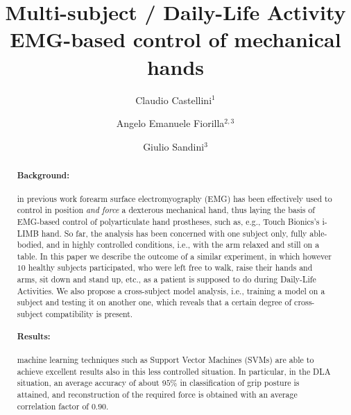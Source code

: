 \documentclass[10pt]{bmc_article}
\newenvironment{bmcformat}{\begin{raggedright}\baselineskip20pt\sloppy\setboolean{publ}{false}}{\end{raggedright}\baselineskip20pt\sloppy}
\begin{document}
\begin{bmcformat}

\title{Multi-subject / Daily-Life Activity\\EMG-based control of mechanical hands}
 
\author{%
  Claudio Castellini\correspondingauthor$^1$%
\and
  Angelo Emanuele Fiorilla$^{2,3}$%
\and
  Giulio Sandini$^3$%
}%

\address{%
    \iid(1)LIRA-Lab, University of Genova, viale F. Causa 13, 16145 Genova, Italy\\
    \iid(2)DIST, University of Genova, viale F. Causa 13, 16145 Genova, Italy\\
    \iid(3)Italian Institute of Technology, via Morego 30, 16163 Genova, Italy
}%

\maketitle

\begin{abstract}

\paragraph*{Background:}
in previous work \cite{2008.ICRA,2008.BioCyb}
forearm surface electromyography (EMG) has been effectively used to
control in position \emph{and force} a dexterous mechanical hand, thus laying the basis of
EMG-based control of polyarticulate hand prostheses, such as, e.g.,
Touch Bionics's i-LIMB hand.
So far, the analysis has been concerned with one subject only, fully
able-bodied, and in highly controlled conditions, i.e., with the arm
relaxed and still on a table. In this paper we describe the outcome of a similar experiment, in which however $10$ healthy subjects participated,
who were left free to walk, raise their hands and arms, sit
down and stand up, etc., as a patient is supposed to do during
Daily-Life Activities. We also propose a cross-subject model analysis, i.e., training a model on a subject and testing it on another one, which reveals that a certain degree of cross-subject compatibility is present.
      
\paragraph*{Results:}
machine learning techniques such as Support Vector Machines (SVMs) are able to achieve excellent results also in this less controlled situation. In particular, in the DLA situation, an average accuracy of about $95\%$ in classification of grip posture is attained, and reconstruction of the required force is obtained with an average correlation factor of $0.90$.


\end{abstract}
\end{bmcformat}
\end{document}
